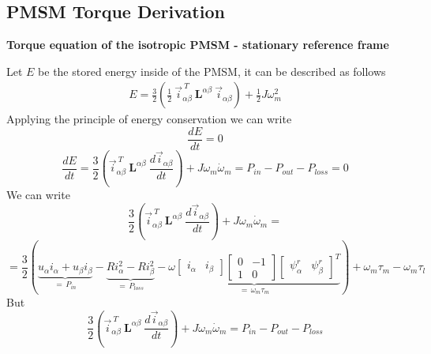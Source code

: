 \documentclass[12pt,a4paper,oneside]{book}
\begin{document}
\begin{onehalfspace}
\subsection{PMSM Torque Derivation}
\textbf{Torque equation of the isotropic PMSM - stationary reference 
	frame}

Let $E$ be the stored energy inside of the PMSM, it can be described as 
follows
\begin{equation*}
	\begin{aligned}
		E = \frac{3}{2} \left(\frac{1}{2}\ \vec{i}_{\alpha\beta}^{\ T}\ 
		\mathbf{L}^{\alpha\beta}\ \vec{i}_{\alpha\beta}\right) 
		+\frac{1}{2}J\omega_m^2
	\end{aligned} 
\end{equation*}
Applying the principle of energy conservation we can write
\begin{equation*}
	\frac{dE}{dt} = 0
\end{equation*}
\begin{equation*}
	\frac{dE}{dt} = \frac{3}{2} \left( \vec{i}_{\alpha\beta}^{\ T}\ 
	\mathbf{L}^{\alpha\beta}\ \frac{d\vec{i}_{\alpha\beta}}{dt}\right) + 
	J\omega_m\dot{\omega}_m= P_{in}-P_{out}-P_{loss} = 0
\end{equation*}
We can write
\begin{equation*}
	\frac{3}{2} \left( \vec{i}_{\alpha\beta}^{\ T}\ 
	\mathbf{L}^{\alpha\beta}\ \frac{d\vec{i}_{\alpha\beta}}{dt}\right) + 
	J\omega_m\dot{\omega}_m =
\end{equation*}
\begin{equation*}
	=\frac{3}{2}\left( \underbrace{u_\alpha i_\alpha+u_\beta 
		i_\beta}_{=\,P_{in}}-\underbrace{Ri_\alpha^2-Ri_\beta^2}_{=\,P_{loss}}- 
	\underbrace{\omega
		\begin{bmatrix} i_\alpha & i_\beta \end{bmatrix}
		\begin{bmatrix} 0 & -1 \\ 1 & 0\end{bmatrix}
		\begin{bmatrix} \psi^r_\alpha & \psi^r_\beta \end{bmatrix}^T
	}_{=\,\omega_m\tau_m}\right)  +\omega_m\tau_m-\omega_m\tau_l
\end{equation*}
But 
\begin{equation*}
	\frac{3}{2} \left( \vec{i}_{\alpha\beta}^{\ T}\ 
	\mathbf{L}^{\alpha\beta}\ \frac{d\vec{i}_{\alpha\beta}}{dt}\right) + 
	J\omega_m\dot{\omega}_m= P_{in}-P_{out}-P_{loss}
\end{equation*}

\end{onehalfspace}
\end{document}
